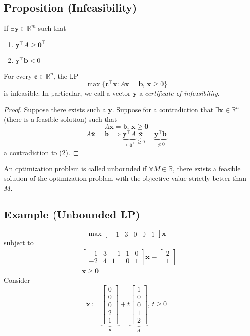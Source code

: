 \begin{thmbox}
    \subsection{Proposition (Infeasibility)}
    If
    $\exists \bm{y}\in\mathbb{R}^m$ such that
    \begin{enumerate}[(1)]
        \item $\bm{y}^\top A\ge\bm{0}^\top $
        \item $\bm{y}^\top \bm{b}<0$
    \end{enumerate}
    For every $\bm{c}\in\mathbb{R}^n$, the LP
    \[\max \{\bm{c}^\top \bm{x} : A\bm{x}=\bm{b},\,
    \bm{x}\ge\bm{0}\}\]
    is infeasible. In particular, we call a vector $\bm{y}$ a \emph{certificate of infeasibility}.
\end{thmbox}

\begin{proof}
Suppose there exists such a $ \bm{y} $.
Suppose for a contradiction that $\exists\bm{\bar{x}}\in\mathbb{R}^n$ 
(there is a feasible solution)
such that
\[A\bm{\bar{x}}=\bm{b} \text{, }\bm{\bar{x}}\ge \bm{0}\]
\[
    A\bm{\bar{x}}=\bm{b}
    \implies
    \underbrace{\bm{y}^\top A}_{\ge\bm{0}^\top }
    \underbrace{\bm{\bar{x}}}_{\ge\bm{0}}
    =\underbrace{\bm{y}^\top \bm{b}}_{\nless 0}
\]
a contradiction to (2).
\end{proof}

An optimization problem is called unbounded if $\forall M\in\mathbb{R}$, there
exists a feasible solution of the optimization problem with the objective 
value strictly better than $M$.
\subsection{Example (Unbounded LP)}
\[\max 
\begin{bmatrix}
    -1 & 3 & 0 & 0 & 1
\end{bmatrix}\bm{x}\]
subject to
\begin{align*}
    &\begin{bmatrix}
        -1 & 3 & -1 & 1 & 0\\
        -2 & 4 & 1 & 0 & 1
    \end{bmatrix}
    \bm{x}
    =
    \begin{bmatrix}
        2\\
        1
    \end{bmatrix}\\
    &\bm{x}\ge \bm{0}
\end{align*}
Consider
\[\bm{\tilde{x}}:=
\underbrace{\begin{bmatrix}
    0\\
    0\\
    0\\
    2\\
    1  
\end{bmatrix}}_{\bm{x}}
+
t
\underbrace{\begin{bmatrix}
    1\\
    0\\
    0\\
    1\\
    2
\end{bmatrix}}_{\bm{d}} \text{, } t\ge 0
\]

